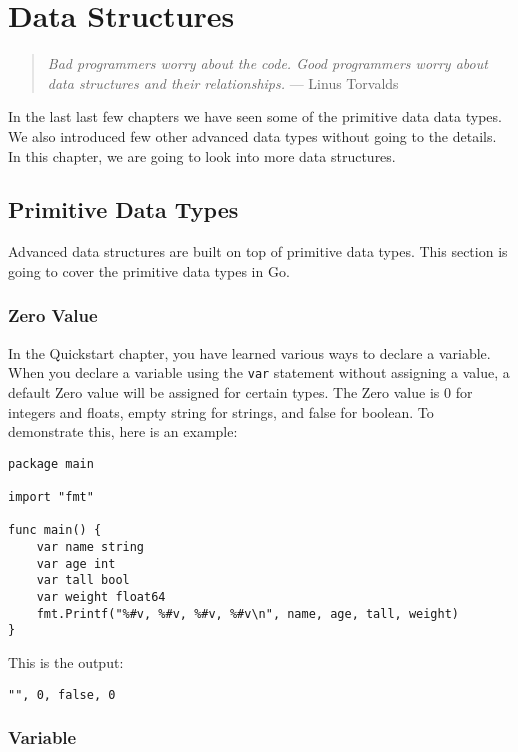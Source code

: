 \cleardoublepage
{}
\chapter{Data Structures}

\begin{quote}
\textit{Bad programmers worry about the code.  Good programmers
worry about data structures and their relationships.} --- Linus
Torvalds
\end{quote}

In the last last few chapters we have seen some of the primitive data
data types.  We also introduced few other advanced data types without
going to the details.  In this chapter, we are going to look into more
data structures.

\section{Primitive Data Types}

Advanced data structures are built on top of primitive data types. This section
is going to cover the primitive data types in Go.

\subsection{Zero Value}

In the Quickstart chapter, you have learned various ways to declare a variable.
When you declare a variable using the \texttt{var}
 statement without assigning a value, a default Zero value
 will be assigned for certain types. The Zero value is 0 for
integers and floats, empty string for strings, and false for boolean. To
demonstrate this, here is an example:

\begin{lstlisting}[caption=Zero values]
package main

import "fmt"

func main() {
    var name string
    var age int
    var tall bool
    var weight float64
    fmt.Printf("%#v, %#v, %#v, %#v\n", name, age, tall, weight)
}
\end{lstlisting}

This is the output:

\begin{lstlisting}[numbers=none]
"", 0, false, 0
\end{lstlisting}

\subsection{Variable}

